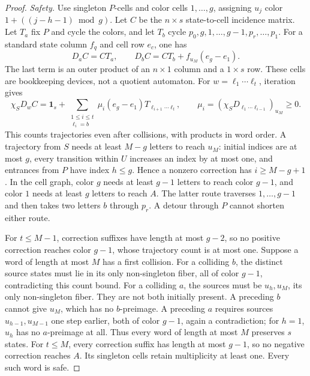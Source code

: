 \documentclass[10pt]{article}
\newcommand{\one}{\mathbf 1}
\begin{document}
\begin{proof}
\emph{Safety.}
Use singleton $P$-cells and color cells $1,\ldots,g$, assigning
$u_j$ color $1+((j-h-1)\bmod g)$.
Let $C$ be the $n\times s$ state-to-cell incidence matrix.
Let $T_a$ fix $P$ and cycle the colors, and let $T_b$ cycle
$p_0,g,1,\ldots,g-1,p_r,\ldots,p_1$.
For a standard state column $f_q$ and cell row $e_c$, one has
\begin{equation}\label{eq:error}
 D_aC=CT_a,\qquad D_bC=CT_b+f_{u_M}(e_g-e_1).
\end{equation}
The last term is an outer product of an $n\times1$ column and a $1\times s$ row.
These cells are bookkeeping devices, not a quotient automaton.
For $w=\ell_1\cdots\ell_t$, iteration gives
\begin{equation}\label{eq:expand}
 \chi_SD_wC=\one_s+
 \sum_{\substack{1\le i\le t\\\ell_i=b}}
 \mu_i(e_g-e_1)T_{\ell_{i+1}\cdots\ell_t},
 \qquad \mu_i=(\chi_SD_{\ell_1\cdots\ell_{i-1}})_{u_M}\ge0.
\end{equation}
This counts trajectories even after collisions, with products in word order.
A trajectory from $S$ needs at least $M-g$ letters to reach $u_M$:
initial indices are at most $g$, every transition within $U$ increases an
index by at most one, and entrances from $P$ have index $h\le g$.
Hence a nonzero correction has $i\ge M-g+1$.
In the cell graph, color $g$ needs at least $g-1$ letters to reach color $g-1$,
and color $1$ needs at least $g$ letters to reach $A$.
The latter route traverses $1,\ldots,g-1$ and then takes two letters $b$
through $p_r$. A detour through $P$ cannot shorten either route.

For $t\le M-1$, correction suffixes have length at most $g-2$,
so no positive correction reaches color $g-1$, whose trajectory count is at most one.
Suppose a word of length at most $M$ has a first collision.
For a colliding $b$, the distinct source states must lie in its only
non-singleton fiber, all of color $g-1$, contradicting this count bound.
For a colliding $a$, the sources must be $u_h,u_M$, its only non-singleton fiber.
They are not both initially present. A preceding $b$ cannot give $u_M$,
which has no $b$-preimage. A preceding $a$ requires sources
$u_{h-1},u_{M-1}$ one step earlier, both of color $g-1$, again a contradiction;
for $h=1$, $u_h$ has no $a$-preimage at all.
Thus every word of length at most $M$ preserves $s$ states.
For $t\le M$, every correction suffix has length at most $g-1$,
so no negative correction reaches $A$. Its singleton cells retain multiplicity
at least one. Every such word is safe.


\end{proof}
\end{document}
